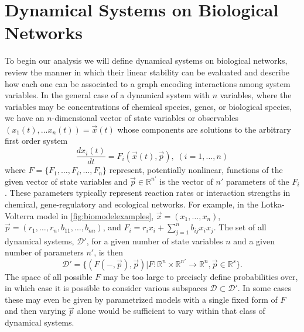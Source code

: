 \section{Dynamical Systems on Biological Networks}

To begin our analysis we will define dynamical systems on biological networks, review the manner in which their linear stability can be evaluated and describe how each one can be associated to a graph encoding interactions among system variables. In the general case of a dynamical system with $n$ variables, where the variables may be concentrations of chemical species, genes, or biological species, we have an $n$-dimensional vector of state variables or observables $(x_1(t), \ldots x_n(t)) = \vec{x}(t)
$
whose components are solutions to the arbitrary first order system
\begin{equation}\label{eq:eom}
\frac{dx_i(t)}{dt} = F_i(\vec{x}(t), \vec{p}), \; (i=1,\ldots,n)
\end{equation}
where $F=\{F_1,\ldots,F_i,\ldots,F_n\}$ represent, potentially nonlinear, functions of the given vector of state variables and $\vec{p} \in \mathbb{R}^{n'}$ is the vector of $n'$ parameters of the $F_i$. These parameters typically represent reaction rates or interaction strengths in chemical, gene-regulatory and ecological networks. For example, in the Lotka-Volterra model in \ref{fig:biomodelexamples}, $\vec{x} = (x_1, \ldots, x_n)$, $\vec{p}=(r_1,\ldots,r_n,b_{11},\ldots,b_{nn})$, and $F_i = r_i x_i + \sum_{j=1}^{n} b_{ij} x_i x_j$. The set of all dynamical systems, $\mathcal{D}'$, for a given number of state variables $n$ and a given number of parameters $n'$, is then
\begin{equation}\label{eq:setdynsys}
\mathcal{D}' = \{ (F(-,\vec{p}),\vec{p}) | F \colon \mathbb{R}^n \times \mathbb{R}^{n'} \rightarrow \mathbb{R}^n, \vec{p} \in \mathbb{R}^s \}.
\end{equation}
The space of all possible $F$ may be too large to precisely define probabilities over, in which case it is possible to consider various subspaces $\mathcal{D} \subset \mathcal{D}'$. In some cases these may even be given by parametrized models with a single fixed form of $F$ and then varying $\vec{p}$ alone would be sufficient to vary within that class of dynamical systems.

